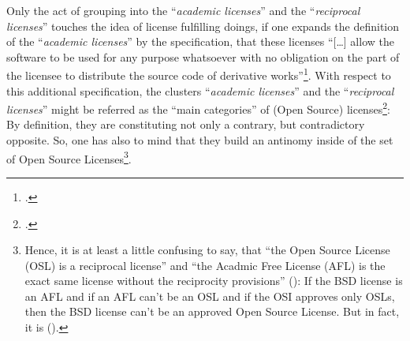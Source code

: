 Only the act of grouping into the \enquote{\emph{academic licenses}} and the
\enquote{\emph{reciprocal licenses}} touches the idea of license fulfilling
doings, if one expands the definition of the \enquote{\emph{academic licenses}}
by the specification, that these licenses \enquote{[\ldots] allow the software
to be used for any purpose whatsoever with no obligation on the part of the
licensee to distribute the source code of derivative
works}\footcite[cf.][71]{Rosen2005a}. With respect to this additional
specification, the clusters \enquote{\emph{academic licenses}} and the
\enquote{\emph{reciprocal licenses}} might be referred as the \enquote{main
categories} of (Open Source) licenses\footcite[cf.][179]{Rosen2005a}: By
definition, they are constituting not only a contrary, but contradictory
opposite. So, one has also to mind that they build an antinomy inside of the set
of Open Source Licenses\footnote{Hence, it is at least a little confusing to
say, that \enquote{the Open Source License (OSL) is a reciprocal license} and
\enquote{the Acadmic Free License (AFL) is the exact same license without the
reciprocity provisions} (\cite[cf.][180]{Rosen2005a}): If the BSD license is an
AFL and if an AFL can't be an OSL and if the OSI approves only OSLs, then the
BSD license can't be an approved Open Source License. But in fact, it is
(\cite[cf.][\nopage wp]{OSI2012b}).}.

